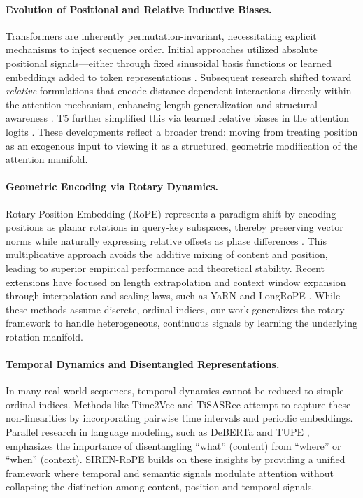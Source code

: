 \documentclass{article}
\begin{document}
\paragraph{Evolution of Positional and Relative Inductive Biases.} 
Transformers are inherently permutation-invariant, necessitating explicit mechanisms to inject sequence order. Initial approaches utilized absolute positional signals---either through fixed sinusoidal basis functions or learned embeddings added to token representations \citep{vaswani2017attention}. Subsequent research shifted toward \emph{relative} formulations that encode distance-dependent interactions directly within the attention mechanism, enhancing length generalization and structural awareness \citep{shaw2018relative, dai2019transformerxl}. T5 further simplified this via learned relative biases in the attention logits \citep{raffel2020t5}. These developments reflect a broader trend: moving from treating position as an exogenous input to viewing it as a structured, geometric modification of the attention manifold.

\paragraph{Geometric Encoding via Rotary Dynamics.} 
Rotary Position Embedding (RoPE) represents a paradigm shift by encoding positions as planar rotations in query-key subspaces, thereby preserving vector norms while naturally expressing relative offsets as phase differences \citep{su2024roformer}. This multiplicative approach avoids the additive mixing of content and position, leading to superior empirical performance and theoretical stability. Recent extensions have focused on length extrapolation and context window expansion through interpolation and scaling laws, such as YaRN and LongRoPE \citep{peng2023yarn, zhang2024longrope}. While these methods assume discrete, ordinal indices, our work generalizes the rotary framework to handle heterogeneous, continuous signals by learning the underlying rotation manifold.

\paragraph{Temporal Dynamics and Disentangled Representations.} 
In many real-world sequences, temporal dynamics cannot be reduced to simple ordinal indices. Methods like Time2Vec \citep{kazemi2019time2vec} and TiSASRec \citep{li2020tisasrec} attempt to capture these non-linearities by incorporating pairwise time intervals and periodic embeddings. Parallel research in language modeling, such as DeBERTa \citep{he2020deberta} and TUPE \citep{ke2020tupe}, emphasizes the importance of disentangling ``what'' (content) from ``where'' or ``when'' (context). SIREN-RoPE builds on these insights by providing a unified framework where temporal and semantic signals modulate attention without collapsing the distinction among content, position and temporal signals.
\end{document}
